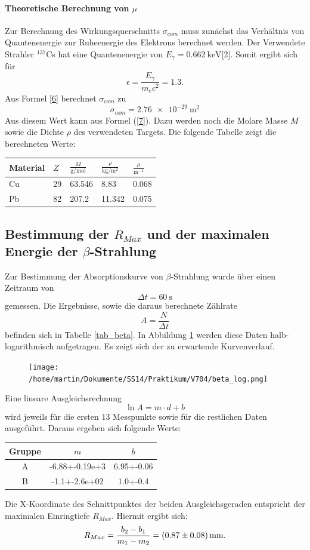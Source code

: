 \documentclass[11pt,ngerman,a4paper]{article}
\begin{document}
\paragraph{Theoretische Berechnung von $\mu$}
Zur Berechnung des Wirkungsquerschnitts $\sigma_{com}$ muss zunächst das Verhältnis von Quantenenergie zur Ruheenergie des Elektrons berechnet werden. Der Verwendete Strahler ${}^{137}$Cs  hat eine Quantenenergie von $E_\gamma = \SI{0.662}{\kilo\eV}$[2]. Somit ergibt sich für 
\[
\epsilon =  \frac{E_\gamma}{m_ec^2} = \num{1.3}.
\]
Aus Formel \ref{6} berechnet $\sigma_{com}$ zu
\[
\sigma_{com} = \SI{2.76e-29}{\meter\squared}
\]
Aus diesem Wert kann aus Formel (\ref{7}). Dazu werden noch die Molare Masse $M$ sowie die Dichte $\rho$ des verwendeten Targets. Die folgende Tabelle zeigt die berechneten Werte:
\begin{table}[h]
\centering
\begin{tabular}{lllll}
\toprule
	Material & $Z$ & $\frac{M}{\si{\gram\per\mole}}$ &$\frac{\rho}{\si{\kilo\gram\per\meter\squared}}$ &$\frac{\mu}{\si{\meter^{-1}}}$ \\
\midrule
	Cu & 29 &63.546  &8.83 & 0.068\\
	Pb &82 & 207.2& 11.342 & 0.075    \\
\bottomrule
\end{tabular}
\label{tab_gamma2}
\end{table} 
\subsection{Bestimmung der $R_{Max}$ und der maximalen Energie der $\beta$-Strahlung}
Zur Bestimmung der Absorptionskurve von $\beta$-Strahlung wurde über einen Zeitraum von
\[
\Delta t = \SI{60}{\second}
\]
gemessen. Die Ergebnisse, sowie die daraus berechnete Zählrate
\[
A = \frac{N}{\Delta t}
\]
befinden sich in Tabelle \ref{tab_beta}. In Abbildung \ref{abb_beta} werden diese Daten halb-logarithmisch aufgetragen. Es zeigt sich der zu erwartende Kurvenverlauf. 
\begin{figure}[htp]
\centering
\texttt{[image: /home/martin/Dokumente/SS14/Praktikum/V704/beta\_log.png]}
\caption{}
\label{abb_beta}
\end{figure}
\newpage
Eine lineare Ausgleichsrechnung
\[
\ln{A} = m\cdot d + b
\]
wird jeweils für die ersten 13 Messpunkte sowie für die restlichen Daten ausgeführt. Daraus ergeben sich folgende Werte:
\begin{table}[h]
\centering
\begin{tabular}{cSS}
	\toprule
	Gruppe & $m$ & $b$\\
	\midrule
	A & -6.88+-0.19e+3 & 6.95+-0.06 \\
	B & -1.1+-2.6e+02 & 1.0+-0.4\\
	\bottomrule
\end{tabular}

\end{table}
Die X-Koordinate des Schnittpunktes der beiden Ausgleichsgeraden entspricht der maximalen Einringtiefe $R_{Max}$. Hiermit ergibt sich:
\begin{equation}
R_{Max} = \frac{b_2-b_1}{m_1-m_2} = \SI{0.87+-0.08}{\milli\meter}.
\end{equation}
\end{document}
